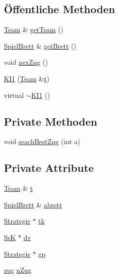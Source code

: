 \subsection*{Öffentliche Methoden}
\begin{DoxyCompactItemize}
\item 
\hyperlink{class_team}{Team} \& \hyperlink{class_k_i1_a792a5464a07175f3038326b0762007dc}{get\+Team} ()
\item 
\hyperlink{class_spiel_brett}{Spiel\+Brett} \& \hyperlink{class_k_i1_adbe73fd3ca768ec59e6096dee4019da2}{get\+Brett} ()
\item 
void \hyperlink{class_k_i1_ae45d6468227902e6ff88ec6e8cd0f9ed}{nex\+Zug} ()
\item 
\hyperlink{class_k_i1_a52f42303bed3e1ec18c9723dabc128ad}{K\+I1} (\hyperlink{class_team}{Team} \&\hyperlink{class_k_i1_a2d2569bdd2b1eb3bd9ed00efed2e46d4}{t})
\item 
virtual \hyperlink{class_k_i1_a31323b74c5ded757c6ddca43014718de}{$\sim$\+K\+I1} ()
\end{DoxyCompactItemize}
\subsection*{Private Methoden}
\begin{DoxyCompactItemize}
\item 
void \hyperlink{class_k_i1_ad5825eed13b20eced9331e2d22efbe9f}{seach\+Best\+Zug} (int a)
\end{DoxyCompactItemize}
\subsection*{Private Attribute}
\begin{DoxyCompactItemize}
\item 
\hyperlink{class_team}{Team} \& \hyperlink{class_k_i1_a2d2569bdd2b1eb3bd9ed00efed2e46d4}{t}
\item 
\hyperlink{class_spiel_brett}{Spiel\+Brett} \& \hyperlink{class_k_i1_ab11a69872d58de0a6baf432518faf25e}{abrett}
\item 
\hyperlink{class_strategie}{Strategie} $\ast$ \hyperlink{class_k_i1_a4c25d6f211ec7c1ad8979f36b3bd9275}{tk}
\item 
\hyperlink{class_ss_k}{Ss\+K} $\ast$ \hyperlink{class_k_i1_ab62258d3c6f9e703764e473b2536b878}{dv}
\item 
\hyperlink{class_strategie}{Strategie} $\ast$ \hyperlink{class_k_i1_a96c4058b36c769ac3a3fa9ddb90327f1}{gp}
\item 
\hyperlink{structzug}{zug} \hyperlink{class_k_i1_a8cd4dc954c817c90e2fc3afcdde0688d}{n\+Zug}
\end{DoxyCompactItemize}


